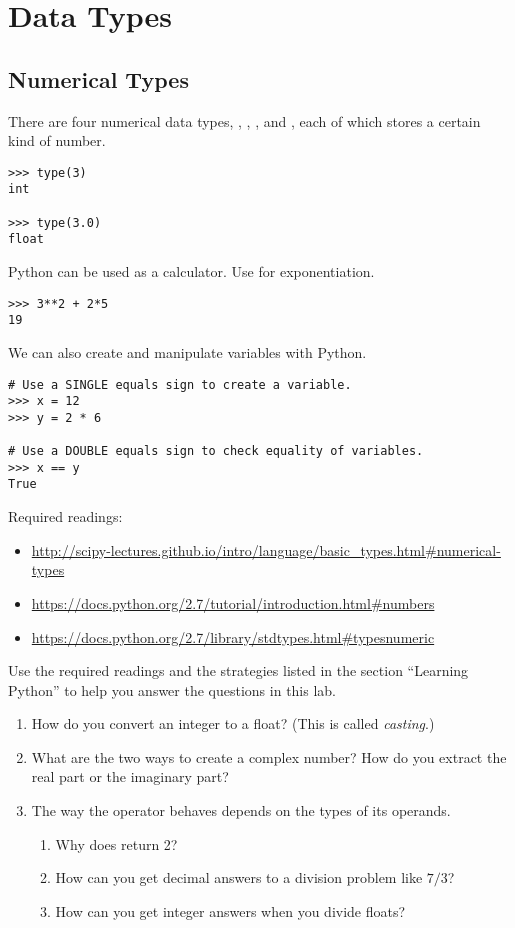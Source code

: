 \section*{Data Types}
\subsection*{Numerical Types}
There are four numerical data types, , , 
, and , each of which stores a certain kind of number. 

\begin{lstlisting}
>>> type(3)
int

>>> type(3.0)
float
\end{lstlisting}

Python can be used as a calculator. Use \li{**} for exponentiation.
\begin{lstlisting}
>>> 3**2 + 2*5
19
\end{lstlisting}

We can also create and manipulate variables with Python.

\begin{lstlisting}
# Use a SINGLE equals sign to create a variable.
>>> x = 12
>>> y = 2 * 6

# Use a DOUBLE equals sign to check equality of variables.
>>> x == y
True
\end{lstlisting}

Required readings: 
\begin{itemize}
\item \url{http://scipy-lectures.github.io/intro/language/basic_types.html#numerical-types}
\item \url{https://docs.python.org/2.7/tutorial/introduction.html#numbers}
\item \url{https://docs.python.org/2.7/library/stdtypes.html#typesnumeric}
\end{itemize}

\begin{problem}
Use the required readings and the strategies listed in the section ``Learning Python'' to help you answer the questions in this lab.
\begin{enumerate}

\item How do you convert an integer to a float? (This is called \emph{casting}.)
\item What are the two ways to create a complex number? 
How do you extract the real part or the imaginary part?
\item The way the operator \li{/} behaves depends on the types of its operands. 
\begin{enumerate}
\item Why does  return 2? 
\item How can you get decimal answers to a division problem like $7/3$? 
\item How can you get integer answers when you divide floats?
\end{enumerate}
\end{enumerate}
\end{problem}




